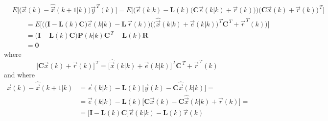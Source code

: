 \documentclass[11pt,a4paper,oneside]{book}
\numberwithin{equation}{section}
\theoremstyle{it}
\theoremstyle{definition}
\begin{document}
\begin{equation}\label{kalman_3d}
	\begin{aligned}
		&E\Big[\Big(\vec{x}(k)-\hat{\vec{x}}(k+1|k)\Big)\vec{y}^{\,T}(k)\Big] = 
		E\Big[\Big(\vec{e}(k|k)-\mathbf{L}(k)\Big(\mathbf{C}\vec{e}(k|k)+\vec{r}(k)\Big)\Big)\Big(\mathbf{C}\vec{x}(k)+\vec{r}(k)\Big)^{\,T}\Big]
		 \\[6pt]
		&\qquad= E\Big[\Big(\Big( 
		\mathbf{I}-\mathbf{L}(k)\mathbf{C}\Big)\vec{e}(k|k) 
		-\mathbf{L}\,\vec{r}(k)\Big) 
		\Big(\Big(\hat{\vec{x}}(k|k)+\vec{e}(k|k)\Big)^{\,T}\mathbf{C}^{\,T}+\vec{r}^{\,T}(k)\Big)\Big]
		 \\[6pt]
		&\qquad=\Big(\mathbf{I}-\mathbf{L}(k)\mathbf{C}\Big)\mathbf{P}(k|k)\mathbf{C}^{\,T}-\mathbf{L}(k)\mathbf{R}
		 \\[6pt]
		&\qquad=\mathbf{0}
	\end{aligned}
\end{equation}
where 
\begin{equation*}
	\Big[\mathbf{C}\vec{x}(k)+\vec{r}(k)\Big]^{\,T} = 
	\Big[\hat{\vec{x}}(k|k)+\vec{e}(k|k)\Big]^{\,T}\mathbf{C}^{\,T}+\vec{r}^{\,T}(k)
\end{equation*}
and where
\begin{equation*}
	\begin{aligned}
		\vec{x}(k)-\hat{\vec{x}}(k+1|k) &= \vec{e}(k|k) - 
		\mathbf{L}(k)\Big[\vec{y}(k)-\mathbf{C}\hat{\vec{x}}(k|k)\Big] = \\[6pt]
		&= \vec{e}(k|k) - 
		\mathbf{L}(k)\Big[\mathbf{C}\vec{x}(k)-\mathbf{C}\hat{\vec{x}}(k|k)+\vec{r}(k)\Big]
		 = \\[6pt]
		&= \Big[\mathbf{I}-\mathbf{L}(k)\mathbf{C}\Big]\vec{e}(k|k) - 
		\mathbf{L}(k)\vec{r}(k)
	\end{aligned}
\end{equation*}
\end{document}
